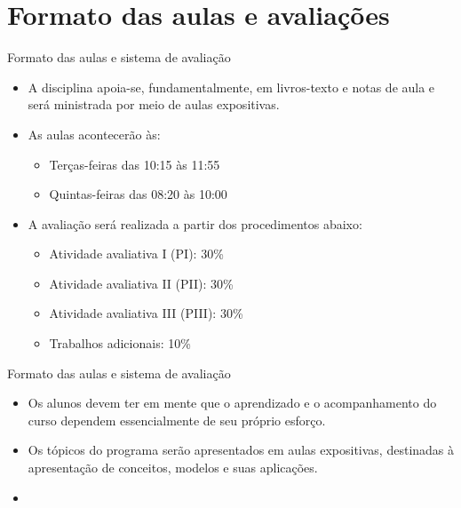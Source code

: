 \documentclass[10pt]{beamer}
\begin{document}
\section{Formato das aulas e avaliações}
\begin{frame}{Formato das aulas e sistema de avaliação}
    \begin{itemize}
        \item A disciplina apoia-se, fundamentalmente, em livros-texto e notas de aula e será ministrada por meio de aulas expositivas.\bigskip

        \item As aulas acontecerão às:\medskip
              \begin{itemize}
                  \item Terças-feiras das 10:15 às 11:55
                  \item Quintas-feiras das 08:20 às 10:00\bigskip
              \end{itemize}

        \item A avaliação será realizada a partir dos procedimentos abaixo:\medskip
              \begin{itemize}
                  \item Atividade avaliativa I (PI): 30\%
                  \item Atividade avaliativa II (PII): 30\%
                  \item Atividade avaliativa III (PIII): 30\%
                  \item Trabalhos adicionais: 10\%
              \end{itemize}
    \end{itemize}
\end{frame}

\begin{frame}{Formato das aulas e sistema de avaliação}
    \begin{itemize}
        \item Os alunos devem ter em mente que o aprendizado e o acompanhamento do curso dependem essencialmente de seu próprio esforço.\bigskip

        \item Os tópicos do programa serão apresentados em aulas expositivas, destinadas à apresentação de conceitos, modelos e suas aplicações.\bigskip

        \item[\emoji{warning}] 
    \end{itemize}
\end{frame}
\end{document}
